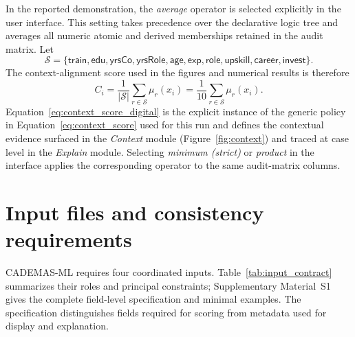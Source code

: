 \documentclass{interact}
\begin{document}
In the reported demonstration, the \textit{average} operator is selected explicitly in the user interface. This setting takes precedence over the declarative logic tree and averages all numeric atomic and derived memberships retained in the audit matrix. Let
\[
\mathcal{S}=\{\textsf{train},\textsf{edu},\textsf{yrsCo},\textsf{yrsRole},
\textsf{age},\textsf{exp},\textsf{role},\textsf{upskill},\textsf{career},\textsf{invest}\}.
\]
The context-alignment score used in the figures and numerical results is therefore
\begin{equation}
C_i=\frac{1}{|\mathcal{S}|}\sum_{r\in\mathcal{S}}\mu_r(x_i)
=\frac{1}{10}\sum_{r\in\mathcal{S}}\mu_r(x_i).
\label{eq:context_score_digital}
\end{equation}
Equation~\eqref{eq:context_score_digital} is the explicit instance of the generic policy in Equation~\eqref{eq:context_score} used for this run and defines the contextual evidence surfaced in the \textit{Context} module (Figure~\ref{fig:context}) and traced at case level in the \textit{Explain} module. Selecting \textit{minimum (strict)} or \textit{product} in the interface applies the corresponding operator to the same audit-matrix columns.

\section{Input files and consistency requirements}\label{app:input_summary}

CADEMAS-ML requires four coordinated inputs. Table~\ref{tab:input_contract} summarizes their roles and principal constraints; Supplementary Material~S1 gives the complete field-level specification and minimal examples. The specification distinguishes fields required for scoring from metadata used for display and explanation.
\end{document}
